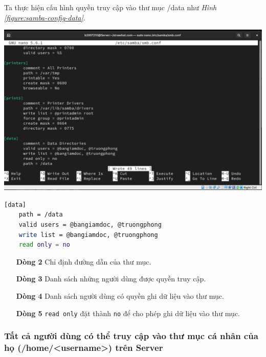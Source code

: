 \documentclass[a4paper, 11pt]{article}
\begin{document}
Ta thực hiện cấu hình quyền truy cập vào thư mục /data như \textit{Hình \ref{figure:samba-config-data}}.

\begin{minipage}
    {\linewidth}
    \captionsetup{type=figure}
    \centering
    \includegraphics[width=\linewidth]{images/samba-config-data.png}
    \caption{Cấu hình quyền truy cập vào thư mục /data trên Server}
    \label{figure:samba-config-data}
\end{minipage}

\begin{lstlisting}[language=bash, caption=Cấu hình quyền truy cập vào thư mục /data trên Server]
[data]
    path = /data
    valid users = @bangiamdoc, @truongphong
    write list = @bangiamdoc, @truongphong
    read only = no
\end{lstlisting}

\begin{itemize}
    \item[\textbf{Dòng 2}] Chỉ định đường dẫn của thư mục.
    \item[\textbf{Dòng 3}] Danh sách những người dùng được quyền truy cập.
    \item[\textbf{Dòng 4}] Danh sách người dùng có quyền ghi dữ liệu vào thư mục.
    \item[\textbf{Dòng 5}] \texttt{read only} đặt thành \texttt{no} để cho phép ghi dữ liệu vào thư mục.
\end{itemize}


\subsubsection{Tất cả người dùng có thể truy cập vào thư mục cá nhân của họ (/home/<username>) trên Server}
\end{document}
